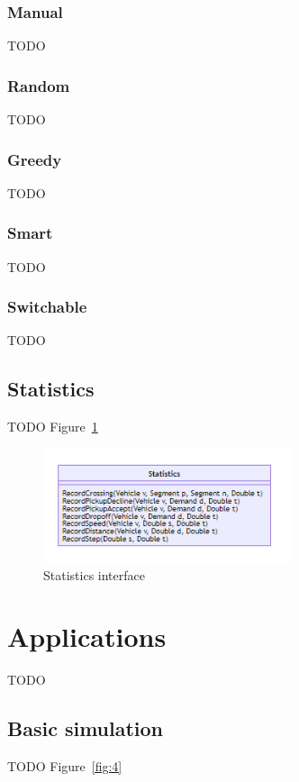 \documentclass{article}
\begin{document}
    \subsubsection{Manual}
    TODO

    \subsubsection{Random}
    TODO
    
    \subsubsection{Greedy}
    TODO

    \subsubsection{Smart}
    TODO

    \subsubsection{Switchable}
    TODO

    \subsection{Statistics}
    TODO Figure~\ref{fig:3}

    \begin{figure}
        \centering
        \includegraphics[width=0.65\textwidth]{../../diagrams/statistics/classes.png}
        \caption{Statistics interface}
        \label{fig:3}
    \end{figure}

    \section{Applications}
    TODO

    \subsection{Basic simulation}
    TODO Figure~\ref{fig:4}
\end{document}
